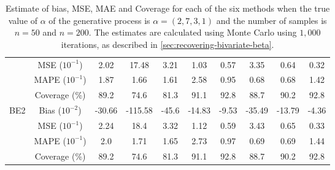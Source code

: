 \begin{table}[htbp]
\begin{tabular}{c|c|cccc|cccc}
& MSE ($10^{-1}$)  & 2.02 & 17.48 & 3.21 & 1.03 & 0.57 & 3.35 & 0.64 & 0.32 \\ 
& MAPE ($10^{-1}$)  & 1.87 & 1.66 & 1.61 & 2.58 & 0.95 & 0.68 & 0.68 & 1.42 \\ 
& Coverage (\%)  & 89.2 & 74.6 & 81.3 & 91.1 & 92.8 & 88.7 & 90.2 & 92.8 \\ 
\hline 
\multirow{4}{*}{BE2}& Bias ($10^{-2}$)  & -30.66 & -115.58 & -45.6 & -14.83 & -9.53 & -35.49 & -13.79 & -4.36 \\ 
& MSE ($10^{-1}$)  & 2.24 & 18.4 & 3.32 & 1.12 & 0.59 & 3.43 & 0.65 & 0.33 \\ 
& MAPE ($10^{-1}$)  & 2.0 & 1.71 & 1.65 & 2.73 & 0.97 & 0.69 & 0.69 & 1.44 \\ 
& Coverage (\%)  & 89.2 & 74.6 & 81.3 & 91.1 & 92.8 & 88.7 & 90.2 & 92.8 \\ 
\end{tabular}
\caption{\label{tab:alpha-experiment2}Estimate of bias, MSE, MAE and Coverage for each of the six methods when the true value of $\alpha$ of the generative process is $\alpha = (2,7,3,1)$ and the number of samples is $n=50$ and $n=200$. 
The estimates are calculated using Monte Carlo using $1,000$ iterations, as described in \autoref{sec:recovering-bivariate-beta}.}
\end{table}